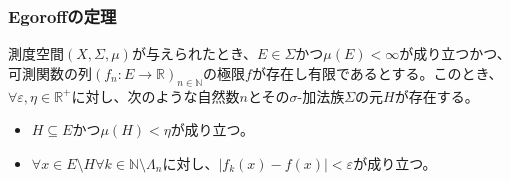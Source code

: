 \documentclass[dvipdfmx]{jsarticle}
\begin{document}
\subsubsection{Egoroffの定理}%
\begin{thm}\label{4.5.5.19}
測度空間$(X,\varSigma,\mu)$が与えられたとき、$E \in \varSigma$かつ$\mu(E) < \infty$が成り立つかつ、可測関数の列$\left( f_{n}:E \rightarrow \mathbb{R} \right)_{n \in \mathbb{N}}$の極限$f$が存在し有限であるとする。このとき、$\forall\varepsilon,\eta \in \mathbb{R}^{+}$に対し、次のような自然数$n$とその$\sigma$-加法族$\varSigma$の元$H$が存在する。
\begin{itemize}
\item
  $H \subseteq E$かつ$\mu(H) < \eta$が成り立つ。
\item
  $\forall x \in E \setminus H\forall k \in \mathbb{N} \setminus \varLambda_{n}$に対し、$\left| f_{k}(x) - f(x) \right| < \varepsilon$が成り立つ。
\end{itemize}
\end{thm}
\end{document}
